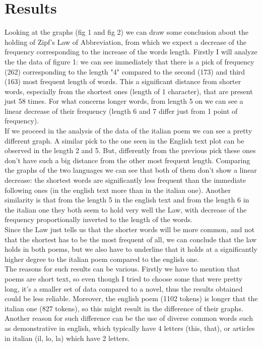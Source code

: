 \section{Results}
Looking at the graphs (fig 1 and fig 2) we can draw some conclusion about the holding of Zipf's Law of Abbreviation, from which we expect a decrease of the frequency corresponding to the increase of the words length.
Firstly I will analyze the the data of figure 1: we can see immediately that there is a pick of frequency (262) corresponding to the length "4" compared to the second (173) and third (163) most frequent length of words. 
This a significant distance from shorter words, especially from the shortest ones (length of 1 character), that are present just 58 times.
For what concerns longer words, from length 5 on we can see a linear decrease of their frequency (length 6 and 7 differ just from 1 point of frequency).\\
If we proceed in the analysis of the data of the italian poem we can see a pretty different graph. 
A similar pick to the one seen in the English text plot can be observed in the length 2 and 5.
But, differently from the previous pick these ones don't have such a big distance from the other most frequent length. 
Comparing the graphs of the two languages we can see that both of them don't show a linear decrease: the shortest words are significantly less frequent than the immediate following ones (in the english text more than in the italian one). 
Another similarity is that from the length 5 in the english text and from the length 6 in the italian one they both seem to hold very well the Law, with decrease of the frequency proportionally inverted to the length of the words.\\
Since the Law just tells us that the shorter words will be more common, and not that the shortest has to be the most frequent of all, we can conclude that the law holds in both poems, but we also have to underline that it holds at a significantly higher degree to the italian poem compared to the english one.\\
The reasons for such results can be various. Firstly we have to mention that poems are short text, so even though I tried to choose some that were pretty long, it's a smaller set of data compared to a novel, thus the results obtained could be less reliable.
Moreover, the english poem (1102 tokens) is longer that the italian one (827 tokens), so this might result in the difference of their graphs.
Another reason for such difference can be the use of diverse common words such as demonstrative in english, which typically have 4 letters (this, that), or articles in italian (il, lo, la) which have 2 letters. \\
